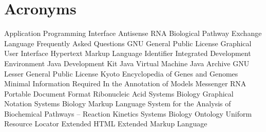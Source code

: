 \chapter{Acronyms}
\begin{acronym}
        {Application Programming Interface}
      {Antisense RNA}
     {Biological Pathway Exchange Language}
        {Frequently Asked Questions}
        {GNU General Public License}
        {Graphical User Interface}
       {Hypertext Markup Language}
         {Identifier}
        {Integrated Development Environment}
        {Java\texttrademark{} Development Kit}
        {Java\texttrademark{} Virtual Machine}
        {Java\texttrademark{} Archive}
       {GNU Lesser General Public License}
       {Kyoto Encyclopedia of Genes and Genomes}
     {Minimal Information Required In the Annotation of Models}
       {Messenger RNA}
        {Portable Document Format}
        {Ribonucleic Acid}
       {Systems Biology Graphical Notation}
       {Systems Biology Markup Language}
   {System for the Analysis of Biochemical Pathways -- Reaction Kinetics}
        {Systems Biology Ontology}
        {Uniform Resource Locator}
      {Extended \acs{HTML}}
        {Extended Markup Language}
\end{acronym}
